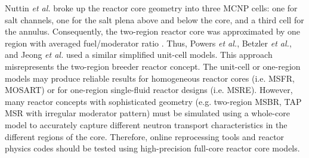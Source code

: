 Nuttin \emph{et al.} broke up the reactor core geometry into three \gls{MCNP} cells: 
one for salt channels, one for the salt plena above and below the core, and a 
third cell for the annulus. Consequently, the two-region reactor core was 
approximated by one region with averaged fuel/moderator ratio 
\cite{nuttin_potential_2005}. Thus, Powers \emph{et 
al.}, Betzler \emph{et al.}, and Jeong \emph{et al.} 
\cite{powers_new_2013,powers_inventory_2014,betzler_modeling_2016, 
betzler_molten_2017, jeong_development_2014, jeong_equilibrium_2016} used a 
similar simplified unit-cell models. This approach 
misrepresents the two-region breeder reactor concept. The unit-cell or one-region 
models may produce reliable results for homogeneous reactor cores (i.e. 
\gls{MSFR}, \gls{MOSART}) or for one-region single-fluid reactor designs (i.e. 
\gls{MSRE}). However, many reactor concepts with sophisticated geometry (e.g. 
two-region \gls{MSBR}, \gls{TAP} \gls{MSR} with irregular moderator pattern) must 
be simulated using a whole-core model to accurately capture different neutron 
transport characteristics in the different regions of the core. Therefore, 
online reprocessing tools and reactor physics codes should be tested 
using high-precision full-core reactor core models.

